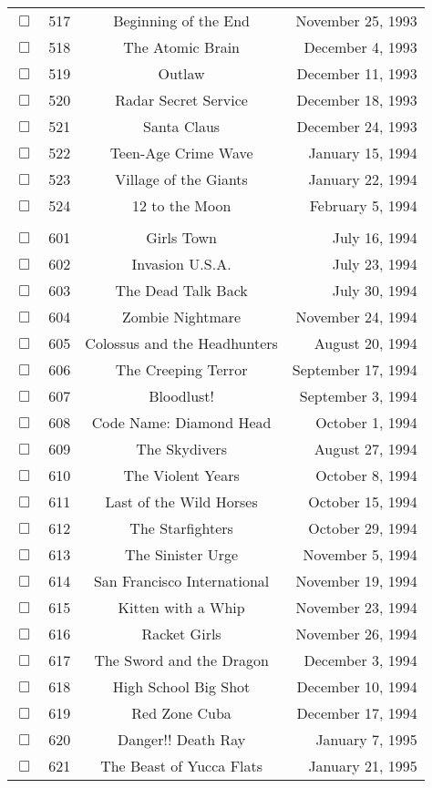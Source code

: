 \documentclass[12pt]{article}
\begin{document}
\begin{center}
\begin{longtable}[c]{cccr}
$\Box$&517&Beginning of the End&November 25, 1993\\
$\Box$&518&The Atomic Brain&December  4, 1993\\
$\Box$&519&Outlaw&December 11, 1993\\
$\Box$&520&Radar Secret Service&December 18, 1993\\
$\Box$&521&Santa Claus&December 24, 1993\\
$\Box$&522&Teen-Age Crime Wave&January 15, 1994\\
$\Box$&523&Village of the Giants&January 22, 1994\\
$\Box$&524&12 to the Moon&February  5, 1994\\
\\
$\Box$&601&Girls Town&July 16, 1994\\
$\Box$&602&Invasion U.S.A.&July 23, 1994\\
$\Box$&603&The Dead Talk Back&July 30, 1994\\
$\Box$&604&Zombie Nightmare&November 24, 1994\\
$\Box$&605&Colossus and the Headhunters&August 20, 1994\\
$\Box$&606&The Creeping Terror&September 17, 1994\\
$\Box$&607&Bloodlust!&September  3, 1994\\
$\Box$&608&Code Name: Diamond Head&October  1, 1994\\
$\Box$&609&The Skydivers&August 27, 1994\\
$\Box$&610&The Violent Years&October  8, 1994\\
$\Box$&611&Last of the Wild Horses&October 15, 1994\\
$\Box$&612&The Starfighters&October 29, 1994\\
$\Box$&613&The Sinister Urge&November  5, 1994\\
$\Box$&614&San Francisco International&November 19, 1994\\
$\Box$&615&Kitten with a Whip&November 23, 1994\\
$\Box$&616&Racket Girls&November 26, 1994\\
$\Box$&617&The Sword and the Dragon&December  3, 1994\\
$\Box$&618&High School Big Shot&December 10, 1994\\
$\Box$&619&Red Zone Cuba&December 17, 1994\\
$\Box$&620&Danger!! Death Ray&January  7, 1995\\
$\Box$&621&The Beast of Yucca Flats&January 21, 1995\\

\end{longtable}
\end{center}
\end{document}
